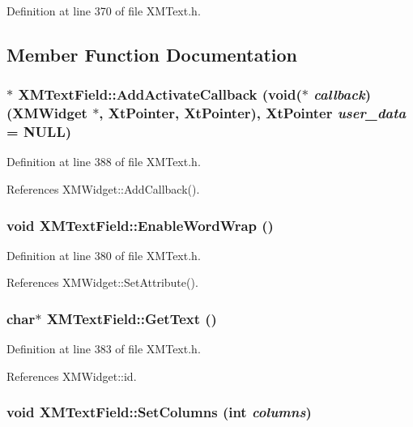 Definition at line 370 of file XMText.h.

\subsection{Member Function Documentation}
\subsubsection{$\ast$ XMText\-Field::Add\-Activate\-Callback (void($\ast$ {\em callback})({\bf XMWidget} $\ast$, Xt\-Pointer, Xt\-Pointer), Xt\-Pointer {\em user\_\-data} = NULL)\hspace{0.3cm}{\tt  [inline]}}\label{classXMTextField_a9}




Definition at line 388 of file XMText.h.

References XMWidget::Add\-Callback().
\subsubsection{\setlength{\rightskip}{0pt plus 5cm}void XMText\-Field::Enable\-Word\-Wrap ()\hspace{0.3cm}{\tt  [inline]}}\label{classXMTextField_a6}




Definition at line 380 of file XMText.h.

References XMWidget::Set\-Attribute().
\subsubsection{\setlength{\rightskip}{0pt plus 5cm}char$\ast$ XMText\-Field::Get\-Text ()\hspace{0.3cm}{\tt  [inline]}}\label{classXMTextField_a7}




Definition at line 383 of file XMText.h.

References XMWidget::id.
\subsubsection{\setlength{\rightskip}{0pt plus 5cm}void XMText\-Field::Set\-Columns (int {\em columns})\hspace{0.3cm}{\tt  [inline]}}\label{classXMTextField_a4}




